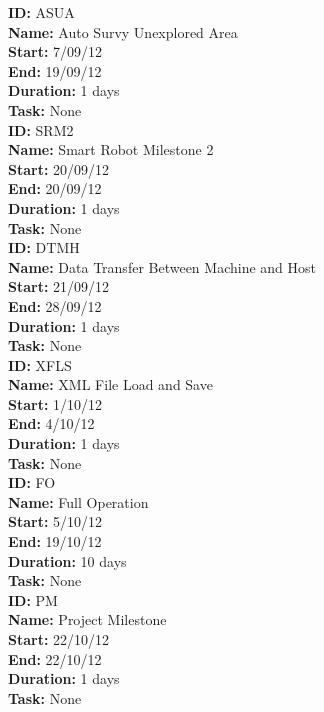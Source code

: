 \documentclass[11pt, a4paper]{report}
\begin{document}
\noindent \textbf{ID:} ASUA \\
\noindent \textbf{Name:} Auto Survy Unexplored Area \\
\noindent \textbf{Start:} 7/09/12 \\
\noindent \textbf{End:} 19/09/12 \\
\noindent \textbf{Duration:} 1 days \\
\noindent \textbf{Task:} None\\[0.5cm]

\noindent \textbf{ID:} SRM2 \\
\noindent \textbf{Name:} Smart Robot Milestone 2 \\
\noindent \textbf{Start:} 20/09/12 \\
\noindent \textbf{End:} 20/09/12 \\
\noindent \textbf{Duration:} 1 days \\
\noindent \textbf{Task:} None\\[0.5cm]

\noindent \textbf{ID:} DTMH \\
\noindent \textbf{Name:} Data Transfer Between Machine and Host \\
\noindent \textbf{Start:} 21/09/12 \\
\noindent \textbf{End:} 28/09/12 \\
\noindent \textbf{Duration:} 1 days \\
\noindent \textbf{Task:} None\\[0.5cm]

\noindent \textbf{ID:} XFLS \\
\noindent \textbf{Name:} XML File Load and Save \\
\noindent \textbf{Start:} 1/10/12 \\
\noindent \textbf{End:} 4/10/12 \\
\noindent \textbf{Duration:} 1 days \\
\noindent \textbf{Task:} None\\[0.5cm]

\noindent \textbf{ID:} FO \\
\noindent \textbf{Name:} Full Operation \\
\noindent \textbf{Start:} 5/10/12 \\
\noindent \textbf{End:} 19/10/12 \\
\noindent \textbf{Duration:} 10 days \\
\noindent \textbf{Task:} None\\[0.5cm]

\noindent \textbf{ID:} PM \\
\noindent \textbf{Name:} Project Milestone \\
\noindent \textbf{Start:} 22/10/12 \\
\noindent \textbf{End:} 22/10/12 \\
\noindent \textbf{Duration:} 1 days \\
\noindent \textbf{Task:} None\\[0.5cm]
\end{document}
